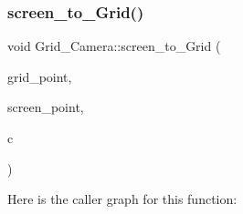 \mbox{\label{namespace_grid___camera_af25668fea8e588c3bebb6841bb3ec4c8}} 
\subsubsection{\texorpdfstring{screen\+\_\+to\+\_\+\+Grid()}{screen\_to\_Grid()}}
{\footnotesize\ttfamily void Grid\+\_\+\+Camera\+::screen\+\_\+to\+\_\+\+Grid (\begin{DoxyParamCaption}\item[{\mbox{\hyperlink{struct_vec2_d_1_1_vec2_d}{Vec2\+D\+::\+Vec2D}} $\ast$}]{grid\+\_\+point,  }\item[{\mbox{\hyperlink{struct_vec2_d_1_1_vec2_d}{Vec2\+D\+::\+Vec2D}} $\ast$}]{screen\+\_\+point,  }\item[{const \mbox{\hyperlink{struct_grid___camera_1_1_grid___camera}{Grid\+\_\+\+Camera}} $\ast$}]{c }\end{DoxyParamCaption})}

Here is the caller graph for this function\+:

